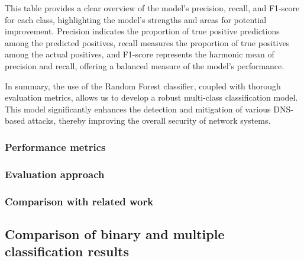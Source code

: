 This table provides a clear overview of the model's precision, recall, and F1-score for each class, highlighting the model's strengths and areas for potential improvement. Precision indicates the proportion of true positive predictions among the predicted positives, recall measures the proportion of true positives among the actual positives, and F1-score represents the harmonic mean of precision and recall, offering a balanced measure of the model's performance.





In summary, the use of the Random Forest classifier, coupled with thorough evaluation metrics, allows us to develop a robust multi-class classification model. This model significantly enhances the detection and mitigation of various DNS-based attacks, thereby improving the overall security of network systems.





\subsubsection{Performance metrics}
\subsubsection{Evaluation approach}
\subsubsection{Comparison with related work}
\subsection{Comparison of binary and multiple classification results}
